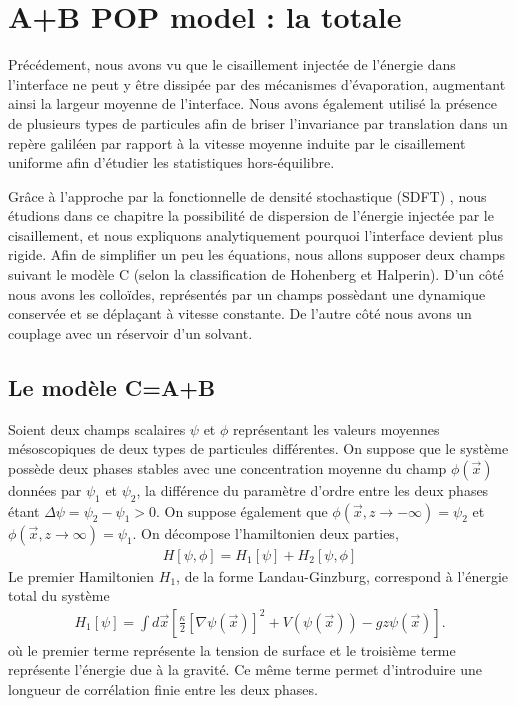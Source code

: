 \chapter{A+B POP model : la totale}
\label{chap-article-dean}

Précédement, nous avons vu que le cisaillement injectée de l'énergie dans l'interface ne peut y être dissipée par des mécanismes d'évaporation, augmentant ainsi la largeur moyenne de l'interface. Nous avons également utilisé la présence de plusieurs types de particules afin de briser l'invariance par translation dans un repère galiléen par rapport à la vitesse moyenne induite par le cisaillement uniforme afin d'étudier les statistiques hors-équilibre.

Grâce à l'approche par la fonctionnelle de densité stochastique (SDFT) \cite{dean1996}, nous étudions dans ce chapitre la possibilité de dispersion de l'énergie injectée par le cisaillement, et nous expliquons analytiquement pourquoi l'interface devient plus rigide.
Afin de simplifier un peu les équations, nous allons supposer deux champs suivant le modèle C (selon la classification de Hohenberg et Halperin\cite{hohenberg_theory_1977}). D'un côté nous avons les colloïdes, représentés par un champs possèdant une dynamique conservée et se déplaçant à vitesse constante. De l'autre côté nous avons un couplage avec un réservoir d'un solvant. 

    \section{Le modèle C=A+B}
    
Soient deux champs scalaires $\psi$ et $\phi$ représentant les valeurs moyennes mésoscopiques de deux types de particules différentes. On suppose que le système possède deux phases stables avec une concentration moyenne du champ $\phi(\vec{x})$ données par $\psi_1$ et  $\psi_2$, la différence du paramètre d'ordre entre les deux phases étant $\Delta\psi= \psi_2 -\psi_1\greater 0$. On suppose également que $\phi(\vec{x},z\rightarrow -\infty)=\psi_2$ et $\phi(\vec{x},z\rightarrow \infty)=\psi_1$. On décompose l'hamiltonien deux parties, 
\begin{align}
    H[\psi,\phi] = H_1[\psi] +H_2[\psi,\phi]
\end{align}
Le premier Hamiltonien $H_1$, de la forme Landau-Ginzburg, correspond à l'énergie total du système
\begin{align}
    H_1[\psi]=\int d\vec{x}\left[\frac{\kappa}{2}[\nabla\psi(\vec{x})]^2 + V(\psi(\vec{x}))- gz \psi(\vec{x})\right].
\end{align}
où le premier terme représente la tension de surface et le troisième terme représente l'énergie due à la gravité. Ce même terme permet d'introduire une longueur de corrélation finie entre les deux phases. 


